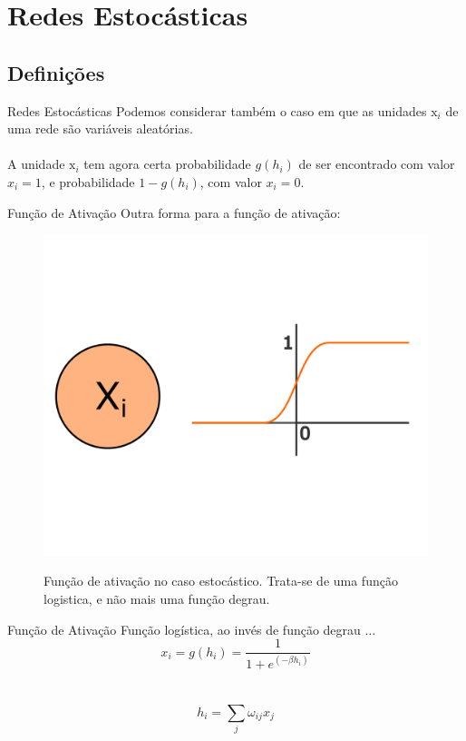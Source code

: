 \section{Redes Estocásticas}

\subsection{Definições}
\begin{frame}{Redes Estocásticas}%
  \justifying%
  Podemos considerar também o caso em que as unidades $\mathrm{x}_{i}$ de uma rede são variáveis aleatórias.
  \\~\\
  A unidade $\mathrm{x}_{i}$ tem agora certa probabilidade $g(h_{i})$ de ser encontrado com valor $x_{i} = 1$, e probabilidade $1 - g(h_{i})$, com valor $x_{i} = 0$.
\end{frame}

\begin{frame}{Função de Ativação}%
  \justifying%
  Outra forma para a função de ativação:
  \begin{figure}[h]{}%
    \label{fig:stoc-activation}%
    \includegraphics[scale=0.35]{images/stochastic_activation.png}
    \caption{Função de ativação no caso estocástico. Trata-se de uma função logistica, e não mais uma função degrau.}
  \end{figure}
\end{frame}

\begin{frame}{Função de Ativação}%
  \justifying%
  Função logística, ao invés de função degrau $\dots$
  \begin{equation}%
    \label{eq:stoc-logistic}
    x_{i} = g(h_{i}) = \frac{1}{1 + e^{(-\beta h_{i})}}
  \end{equation}
  \\~\\
  \begin{equation}%
    \label{eq:hi}%
    h_{i} = \sum_{j} \omega_{ij} x_{j}
  \end{equation}
\end{frame}

